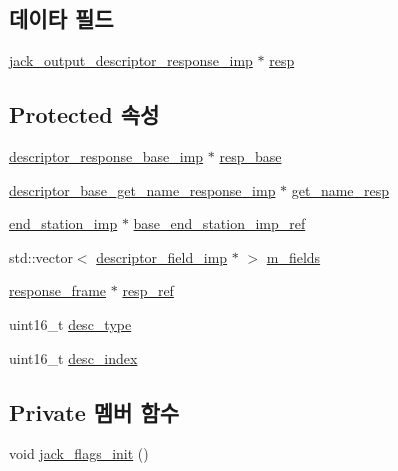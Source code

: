 \subsection*{데이타 필드}
\begin{DoxyCompactItemize}
\item 
\hyperlink{classavdecc__lib_1_1jack__output__descriptor__response__imp}{jack\+\_\+output\+\_\+descriptor\+\_\+response\+\_\+imp} $\ast$ \hyperlink{classavdecc__lib_1_1jack__output__descriptor__imp_a96d6012d730e6c0874b29a36c285181b}{resp}
\end{DoxyCompactItemize}
\subsection*{Protected 속성}
\begin{DoxyCompactItemize}
\item 
\hyperlink{classavdecc__lib_1_1descriptor__response__base__imp}{descriptor\+\_\+response\+\_\+base\+\_\+imp} $\ast$ \hyperlink{classavdecc__lib_1_1descriptor__base__imp_a8b104da8319cda946944548ebb9552f4}{resp\+\_\+base}
\item 
\hyperlink{classavdecc__lib_1_1descriptor__base__get__name__response__imp}{descriptor\+\_\+base\+\_\+get\+\_\+name\+\_\+response\+\_\+imp} $\ast$ \hyperlink{classavdecc__lib_1_1descriptor__base__imp_a7d3a410eb242dc2b7abe9862a1593458}{get\+\_\+name\+\_\+resp}
\item 
\hyperlink{classavdecc__lib_1_1end__station__imp}{end\+\_\+station\+\_\+imp} $\ast$ \hyperlink{classavdecc__lib_1_1descriptor__base__imp_a550c969411f5f3b69f55cc139763d224}{base\+\_\+end\+\_\+station\+\_\+imp\+\_\+ref}
\item 
std\+::vector$<$ \hyperlink{classavdecc__lib_1_1descriptor__field__imp}{descriptor\+\_\+field\+\_\+imp} $\ast$ $>$ \hyperlink{classavdecc__lib_1_1descriptor__base__imp_adce67136eb9c66da9c189b730077b9cd}{m\+\_\+fields}
\item 
\hyperlink{classavdecc__lib_1_1response__frame}{response\+\_\+frame} $\ast$ \hyperlink{classavdecc__lib_1_1descriptor__base__imp_a2642e3a7c10d38553e7ff4a55e875346}{resp\+\_\+ref}
\item 
uint16\+\_\+t \hyperlink{classavdecc__lib_1_1descriptor__base__imp_a9dada313309522d04f1e52fe887442b4}{desc\+\_\+type}
\item 
uint16\+\_\+t \hyperlink{classavdecc__lib_1_1descriptor__base__imp_a2bbd0d8f32f687ca36aaa543c06f764c}{desc\+\_\+index}
\end{DoxyCompactItemize}
\subsection*{Private 멤버 함수}
\begin{DoxyCompactItemize}
\item 
void \hyperlink{classavdecc__lib_1_1jack__output__descriptor__imp_a6de95e6c9b0a71154f1451a6a19da19f}{jack\+\_\+flags\+\_\+init} ()
\end{DoxyCompactItemize}


